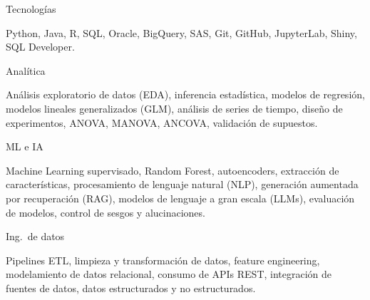 
\raggedright

\begin{cvskills}

  \cvskill
    {\begin{minipage}[t]{0.28\linewidth}\raggedright Tecnologías\end{minipage}}
    {\parbox[t]{0.72\linewidth}{
    Python, Java, R, SQL, Oracle, BigQuery, SAS, Git, GitHub, JupyterLab, Shiny, SQL Developer.
    }}

  \cvskill
    {\begin{minipage}[t]{0.28\linewidth}\raggedright Analítica\end{minipage}}
    {\parbox[t]{0.72\linewidth}{
    Análisis exploratorio de datos (EDA), inferencia estadística, modelos de regresión,
    modelos lineales generalizados (GLM), análisis de series de tiempo, diseño de experimentos,
    ANOVA, MANOVA, ANCOVA, validación de supuestos.
    }}

  \cvskill
    {\begin{minipage}[t]{0.28\linewidth}\raggedright ML e IA\end{minipage}}
    {\parbox[t]{0.72\linewidth}{
    Machine Learning supervisado, Random Forest, autoencoders, extracción de características,
    procesamiento de lenguaje natural (NLP), generación aumentada por recuperación (RAG),
    modelos de lenguaje a gran escala (LLMs), evaluación de modelos, control de sesgos y alucinaciones.
    }}

  \cvskill
    {\begin{minipage}[t]{0.28\linewidth}\raggedright Ing.\ de datos\end{minipage}}
    {\parbox[t]{0.72\linewidth}{
    Pipelines ETL, limpieza y transformación de datos, feature engineering,
    modelamiento de datos relacional, consumo de APIs REST, integración de fuentes de datos,
    datos estructurados y no estructurados.
    }}

\end{cvskills}
